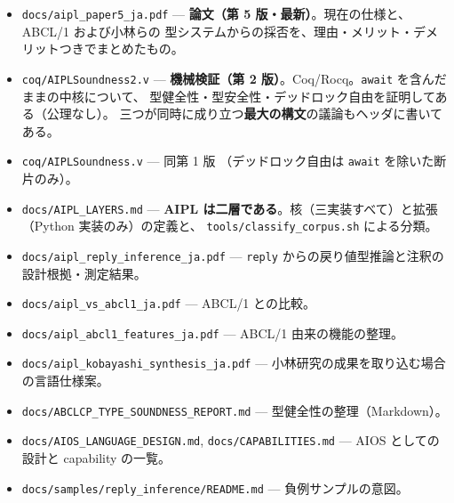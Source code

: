 \documentclass[11pt,a4paper]{ltjsarticle}
\begin{document}
\begin{itemize}
\item \texttt{docs/aipl\_paper5\_ja.pdf} ---
  \textbf{論文（第 5 版・最新）}。現在の仕様と、ABCL/1 および小林らの
  型システムからの採否を、理由・メリット・デメリットつきでまとめたもの。
\item \texttt{coq/AIPLSoundness2.v} ---
  \textbf{機械検証（第 2 版）}。Coq/Rocq。\texttt{await} を含んだままの中核について、
  型健全性・型安全性・デッドロック自由を証明してある（公理なし）。
  三つが同時に成り立つ\textbf{最大の構文}の議論もヘッダに書いてある。
\item \texttt{coq/AIPLSoundness.v} --- 同第 1 版
  （デッドロック自由は \texttt{await} を除いた断片のみ）。
\item \texttt{docs/AIPL\_LAYERS.md} ---
  \textbf{AIPL は二層である}。核（三実装すべて）と拡張（Python 実装のみ）の定義と、
  \texttt{tools/classify\_corpus.sh} による分類。
\item \texttt{docs/aipl\_reply\_inference\_ja.pdf} ---
  \texttt{reply} からの戻り値型推論と注釈の設計根拠・測定結果。
\item \texttt{docs/aipl\_vs\_abcl1\_ja.pdf} --- ABCL/1 との比較。
\item \texttt{docs/aipl\_abcl1\_features\_ja.pdf} --- ABCL/1 由来の機能の整理。
\item \texttt{docs/aipl\_kobayashi\_synthesis\_ja.pdf} ---
  小林研究の成果を取り込む場合の言語仕様案。
\item \texttt{docs/ABCLCP\_TYPE\_SOUNDNESS\_REPORT.md} --- 型健全性の整理（Markdown）。
\item \texttt{docs/AIOS\_LANGUAGE\_DESIGN.md}, \texttt{docs/CAPABILITIES.md} ---
  AIOS としての設計と capability の一覧。
\item \texttt{docs/samples/reply\_inference/README.md} --- 負例サンプルの意図。
\end{itemize}
\end{document}
